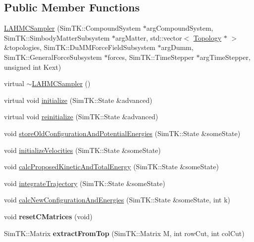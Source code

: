 \subsection*{Public Member Functions}
\begin{DoxyCompactItemize}
\item 
\hyperlink{classLAHMCSampler_ac139a08ec777cd64d1166cf1b47d77cd}{L\+A\+H\+M\+C\+Sampler} (Sim\+T\+K\+::\+Compound\+System $\ast$arg\+Compound\+System, Sim\+T\+K\+::\+Simbody\+Matter\+Subsystem $\ast$arg\+Matter, std\+::vector$<$ \hyperlink{classTopology}{Topology} $\ast$ $>$ \&topologies, Sim\+T\+K\+::\+Du\+M\+M\+Force\+Field\+Subsystem $\ast$arg\+Dumm, Sim\+T\+K\+::\+General\+Force\+Subsystem $\ast$forces, Sim\+T\+K\+::\+Time\+Stepper $\ast$arg\+Time\+Stepper, unsigned int Kext)
\item 
virtual \hyperlink{classLAHMCSampler_ae6c15a0a2cd4dfc3f6873f5182182a19}{$\sim$\+L\+A\+H\+M\+C\+Sampler} ()
\item 
virtual void \hyperlink{classLAHMCSampler_a4cf1b6d5169675be6687b2eef7e14c61}{initialize} (Sim\+T\+K\+::\+State \&advanced)
\item 
virtual void \hyperlink{classLAHMCSampler_a11e1f9bee0627776686d546efba9d2e6}{reinitialize} (Sim\+T\+K\+::\+State \&advanced)
\item 
void \hyperlink{classLAHMCSampler_a95a06df36c18ea2cad5bea8a7e2b5926}{store\+Old\+Configuration\+And\+Potential\+Energies} (Sim\+T\+K\+::\+State \&some\+State)
\item 
void \hyperlink{classLAHMCSampler_a647e291c4044ca37a4bff16753b76416}{initialize\+Velocities} (Sim\+T\+K\+::\+State \&some\+State)
\item 
void \hyperlink{classLAHMCSampler_a230ea62c24f9873aee71b4fe50049385}{calc\+Proposed\+Kinetic\+And\+Total\+Energy} (Sim\+T\+K\+::\+State \&some\+State)
\item 
void \hyperlink{classLAHMCSampler_a2759e95ec5a15a447a20b59f3df28ef8}{integrate\+Trajectory} (Sim\+T\+K\+::\+State \&some\+State)
\item 
void \hyperlink{classLAHMCSampler_ae90a88374791995683313425966a4b7a}{calc\+New\+Configuration\+And\+Energies} (Sim\+T\+K\+::\+State \&some\+State, int k)
\item 
void {\bfseries reset\+C\+Matrices} (void)\hypertarget{classLAHMCSampler_ae148d78b17cafbacd047dc86a64556d4}{}\label{classLAHMCSampler_ae148d78b17cafbacd047dc86a64556d4}

\item 
Sim\+T\+K\+::\+Matrix {\bfseries extract\+From\+Top} (Sim\+T\+K\+::\+Matrix M, int row\+Cut, int col\+Cut)\hypertarget{classLAHMCSampler_aafbbd957069afd2ef1132414182f869e}{}\label{classLAHMCSampler_aafbbd957069afd2ef1132414182f869e}


\end{DoxyCompactItemize}
